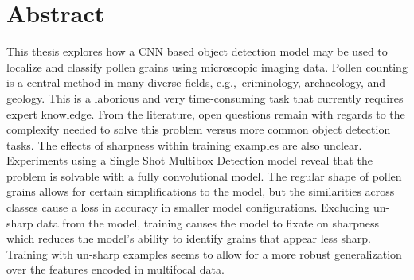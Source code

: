 \chapter*{Abstract}
This thesis explores how a CNN based object detection model may be used to localize and classify pollen grains using microscopic imaging data.
Pollen counting is a central method in many diverse fields, e.g.,\ criminology, archaeology, and geology.
This is a laborious and very time-consuming task that currently requires expert knowledge.
From the literature, open questions remain with regards to the complexity needed to solve this problem versus more common object detection tasks.
The effects of sharpness within training examples are also unclear.
Experiments using a Single Shot Multibox Detection model reveal that the problem is solvable with a fully convolutional model.
The regular shape of pollen grains allows for certain simplifications to the model, but the similarities across classes cause a loss in accuracy in smaller model configurations.
Excluding un-sharp data from the model, training causes the model to fixate on sharpness which reduces the model's ability to identify grains that appear less sharp.
Training with un-sharp examples seems to allow for a more robust generalization over the features encoded in multifocal data.


